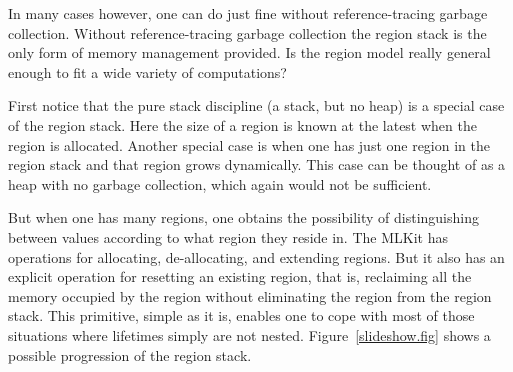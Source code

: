 \documentclass[12pt]{book}
\begin{document}
In many cases however, one can do just fine without reference-tracing
garbage collection. Without reference-tracing garbage collection the
region stack is the only form of memory management provided. Is the
region model really general enough to fit a wide variety of
computations?

First notice that the pure
%
stack discipline (a stack, but no heap) is a special case of the
region stack. Here the size of a region is known at the latest when
the region is allocated. Another special case is when one has just one
region in the region stack and that region grows dynamically.  This
case can be thought of as a
%
heap with no garbage collection, which again would not be sufficient.

But when one has many regions, one obtains the possibility of
distinguishing between values according to what region they reside in.
The MLKit has operations for allocating, de-allocating, and extending
regions. But it also has an explicit operation for
%
resetting an existing region, that is, reclaiming all the memory
occupied by the region without eliminating the region from the region
stack.  This primitive, simple as it is, enables one to cope with most
of those situations where lifetimes simply are not nested.
Figure~\ref{slideshow.fig} shows a possible progression of the region
stack.
\end{document}
